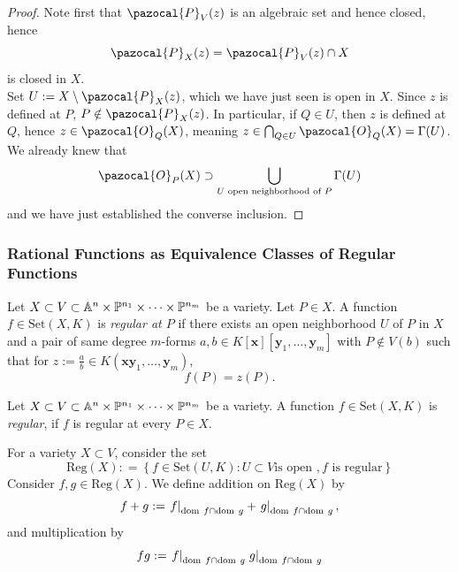     \begin{proof}
        Note first that $\pazocal{P}_{V}(z)$ is an algebraic set and hence closed, hence 
        $$
            \pazocal{P}_{X}(z)=\pazocal{P}_{V}(z)\cap X
        $$ 
        is closed in $X$.\\
        Set $U:= X\setminus \pazocal{P}_X(z)$, which we have just seen is open in $X$. Since $z$ is defined at $P$, $P\notin \pazocal{P}_X(z)$. In particular, if $Q\in U$, then $z$ is defined at $Q$, hence $z\in \pazocal{O}_Q(X)$, meaning $z\in \bigcap_{Q\in U} \pazocal{O}_Q(X)=\Gamma(U)$. We already knew that 
        $$\pazocal{O}_P(X)\supset \bigcup_{U\text{ open neighborhood of } P} \Gamma(U)$$
        and we have just established the converse inclusion. 
    \end{proof}
    \subsubsection{Rational Functions as Equivalence Classes of Regular Functions}
    \begin{definition}
        Let $X\subset V \subset \mathbb{A}^n\times \mathbb{P}^{n_1}\times \cdots \times \mathbb{P}^{n_m}$ be a variety. Let $P\in X$. A function $f\in \mathrm{Set}(X,K)$ is \emph{regular at $P$} if there exists an open neighborhood $U$ of $P$ in $X$ and a pair of same degree $m$-forms $a,b\in K[\mathbf{x}][\mathbf{y}_1,\dots, \mathbf{y}_m]$ with $P\notin V(b)$ such that for $z:=\frac{a}{b}\in K(\mathbf{x}\mathbf{y}_1,\dots, \mathbf{y}_m)$, 
        $$
            f(P)=z(P).
        $$     
    \end{definition}
    \begin{definition}
        Let $X\subset V \subset \mathbb{A}^n\times \mathbb{P}^{n_1}\times \cdots \times \mathbb{P}^{n_m}$ be a variety. A function $f\in \mathrm{Set}(X,K)$ is \emph{regular}, if $f$ is regular at every $P\in X$. 
    \end{definition}
    \begin{definition}
    For a variety $X\subset V$, consider the set 
        $$
            \mathrm{Reg}(X) : = \left\{f\in \mathrm{Set}(U,K) : U\subset V \text{is open }, f \text{ is regular}\right\}
        $$
        Consider $f,g\in \mathrm{Reg}(X)$. We define addition on $\mathrm{Reg}(X)$ by 
        $$
            f + g := \left. f\right|_{\mathrm{dom} \ f \cap \mathrm{dom}\ g} + \left. g\right|_{\mathrm{dom}\ f\cap \mathrm{dom} \ g},
        $$
        and multiplication by
        $$
            fg := \left. f\right|_{\dom \ f \cap \dom\ g}  \left. g\right|_{\dom\ f\cap \dom \ g}
        $$ 
    \end{definition}
